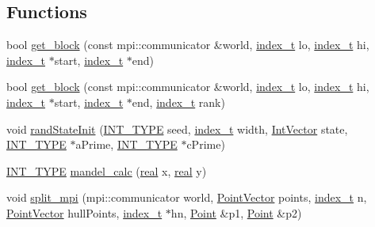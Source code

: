 \subsection*{Functions}
\begin{CompactItemize}
\item 
bool \hyperlink{namespacecowichan__mpi_bb7c07d8b23660efe06c7ee12d60bbdc}{get\_\-block} (const mpi::communicator \&world, \hyperlink{cowichan_8hpp_5b04577d5d21124855deaad298595371}{index\_\-t} lo, \hyperlink{cowichan_8hpp_5b04577d5d21124855deaad298595371}{index\_\-t} hi, \hyperlink{cowichan_8hpp_5b04577d5d21124855deaad298595371}{index\_\-t} $\ast$start, \hyperlink{cowichan_8hpp_5b04577d5d21124855deaad298595371}{index\_\-t} $\ast$end)
\item 
bool \hyperlink{namespacecowichan__mpi_413bf41c8bf73b560d1c16a8e5206e5f}{get\_\-block} (const mpi::communicator \&world, \hyperlink{cowichan_8hpp_5b04577d5d21124855deaad298595371}{index\_\-t} lo, \hyperlink{cowichan_8hpp_5b04577d5d21124855deaad298595371}{index\_\-t} hi, \hyperlink{cowichan_8hpp_5b04577d5d21124855deaad298595371}{index\_\-t} $\ast$start, \hyperlink{cowichan_8hpp_5b04577d5d21124855deaad298595371}{index\_\-t} $\ast$end, \hyperlink{cowichan_8hpp_5b04577d5d21124855deaad298595371}{index\_\-t} rank)
\item 
void \hyperlink{namespacecowichan__mpi_9a2d3b047e280fd12498b0ccd86c4677}{randStateInit} (\hyperlink{cowichan_8hpp_c96945095fd0ce7186a1d00a89f77d2c}{INT\_\-TYPE} seed, \hyperlink{cowichan_8hpp_5b04577d5d21124855deaad298595371}{index\_\-t} width, \hyperlink{cowichan_8hpp_9bab229b7d95f858be62c35cca6ff294}{IntVector} state, \hyperlink{cowichan_8hpp_c96945095fd0ce7186a1d00a89f77d2c}{INT\_\-TYPE} $\ast$aPrime, \hyperlink{cowichan_8hpp_c96945095fd0ce7186a1d00a89f77d2c}{INT\_\-TYPE} $\ast$cPrime)
\item 
\hyperlink{cowichan_8hpp_c96945095fd0ce7186a1d00a89f77d2c}{INT\_\-TYPE} \hyperlink{namespacecowichan__mpi_a2af23c28ab53e0577f4332936467475}{mandel\_\-calc} (\hyperlink{cowichan_8hpp_4d521b2c54a1f6312cc8fa04827eaf98}{real} x, \hyperlink{cowichan_8hpp_4d521b2c54a1f6312cc8fa04827eaf98}{real} y)
\item 
void \hyperlink{namespacecowichan__mpi_c9ddfd8c08bb0f11a90abac20453dd2c}{split\_\-mpi} (mpi::communicator world, \hyperlink{class_point}{PointVector} points, \hyperlink{cowichan_8hpp_5b04577d5d21124855deaad298595371}{index\_\-t} n, \hyperlink{class_point}{PointVector} hullPoints, \hyperlink{cowichan_8hpp_5b04577d5d21124855deaad298595371}{index\_\-t} $\ast$hn, \hyperlink{class_point}{Point} \&p1, \hyperlink{class_point}{Point} \&p2)

\end{CompactItemize}
